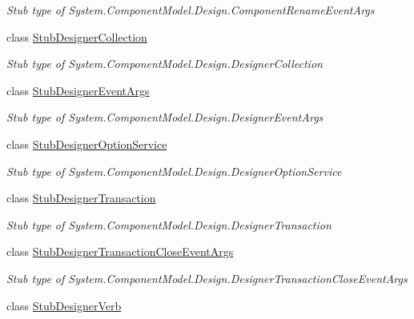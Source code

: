 \begin{DoxyCompactItemize}
\begin{DoxyCompactList}\small\item\em Stub type of System.\-Component\-Model.\-Design.\-Component\-Rename\-Event\-Args\end{DoxyCompactList}\item 
class \hyperlink{class_system_1_1_component_model_1_1_design_1_1_fakes_1_1_stub_designer_collection}{Stub\-Designer\-Collection}
\begin{DoxyCompactList}\small\item\em Stub type of System.\-Component\-Model.\-Design.\-Designer\-Collection\end{DoxyCompactList}\item 
class \hyperlink{class_system_1_1_component_model_1_1_design_1_1_fakes_1_1_stub_designer_event_args}{Stub\-Designer\-Event\-Args}
\begin{DoxyCompactList}\small\item\em Stub type of System.\-Component\-Model.\-Design.\-Designer\-Event\-Args\end{DoxyCompactList}\item 
class \hyperlink{class_system_1_1_component_model_1_1_design_1_1_fakes_1_1_stub_designer_option_service}{Stub\-Designer\-Option\-Service}
\begin{DoxyCompactList}\small\item\em Stub type of System.\-Component\-Model.\-Design.\-Designer\-Option\-Service\end{DoxyCompactList}\item 
class \hyperlink{class_system_1_1_component_model_1_1_design_1_1_fakes_1_1_stub_designer_transaction}{Stub\-Designer\-Transaction}
\begin{DoxyCompactList}\small\item\em Stub type of System.\-Component\-Model.\-Design.\-Designer\-Transaction\end{DoxyCompactList}\item 
class \hyperlink{class_system_1_1_component_model_1_1_design_1_1_fakes_1_1_stub_designer_transaction_close_event_args}{Stub\-Designer\-Transaction\-Close\-Event\-Args}
\begin{DoxyCompactList}\small\item\em Stub type of System.\-Component\-Model.\-Design.\-Designer\-Transaction\-Close\-Event\-Args\end{DoxyCompactList}\item 
class \hyperlink{class_system_1_1_component_model_1_1_design_1_1_fakes_1_1_stub_designer_verb}{Stub\-Designer\-Verb}

\end{DoxyCompactItemize}
